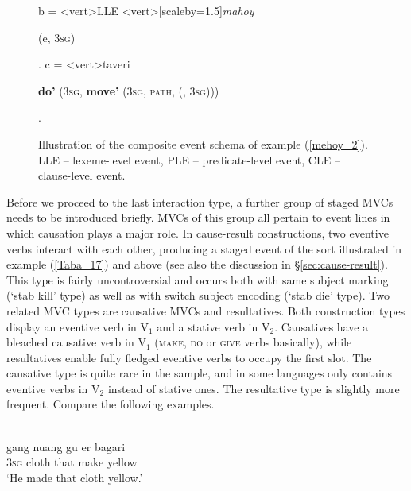 \begin{figure}
\!b = <vert>{LLE}
<vert>[scaleby=1.5]{\textit{mahoy}}
{\begin{scriptsize} \textbf{} (e, 3\textsc{sg})\end{scriptsize}}.
\!c = <vert>{taveri}
{\begin{scriptsize} \textbf{do'} (3\textsc{sg}, \textbf{move'} (3\textsc{sg}, \textsc{path}, \textbf{} (, 3\textsc{sg}))) \end{scriptsize}}.
\endjtree

\caption[Event schema illustration of example (\ref{mehoy_2})]{Illustration of the composite event schema of example (\ref{mehoy_2}). LLE -- lexeme-level event, PLE -- predicate-level event, CLE -- clause-level event.}
\label{figure:eventschema_mehoy_2}
\end{figure}

Before we proceed to the last interaction type, a further group of staged MVCs needs to be introduced briefly. MVCs of this group all pertain to event lines in which causation plays a major role. In cause-result constructions, two eventive verbs interact with each other, producing a staged event of the sort illustrated in example (\ref{Taba_17}) and  above (see also the discussion in §\ref{sec:cause-result}). This type is fairly uncontroversial and occurs both with same subject marking (`stab kill' type) as well as with switch subject encoding (`stab die' type). Two related MVC types are causative MVCs and resultatives. Both construction types display an eventive verb in V$_1$ and a stative verb in V$_2$. Causatives have a bleached causative verb in V$_1$ (\textsc{make}, \textsc{do} or \textsc{give} verbs basically), while resultatives enable fully fledged eventive verbs to occupy the first slot. The causative type is quite rare in the sample, and in some languages only contains eventive verbs in V$_2$ instead of stative ones. The resultative type is slightly more frequent. Compare the following examples.

\ea \label{Kaera20}
\\
\gll gang nuang gu er bagari \\
3\textsc{sg} cloth that make yellow \\
\glft `He made that cloth yellow.' \\ 
\z

